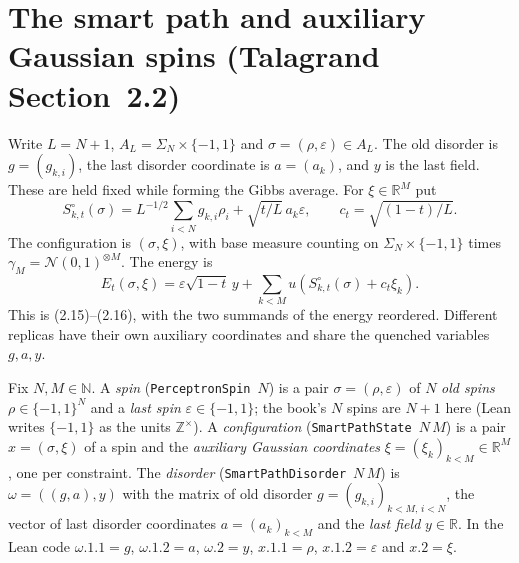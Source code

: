 \section{The smart path and auxiliary Gaussian spins (Talagrand Section~2.2)}\label{sec:sg-tal:perceptron-smart-path}

Write $L=N+1$, $A_L=\Sigma_N\times\{-1,1\}$ and $\sigma=(\rho,\varepsilon)\in A_L$.
The old disorder is $g=(g_{k,i})$, the last disorder coordinate is $a=(a_k)$, and $y$ is the last field.
These are held fixed while forming the Gibbs average. For $\xi\in\mathbb R^M$ put
\[
 S^\circ_{k,t}(\sigma)=L^{-1/2}\sum_{i<N}g_{k,i}\rho_i+\sqrt{t/L}\,a_k\varepsilon,
 \qquad c_t=\sqrt{(1-t)/L}.
\]
The configuration is $(\sigma,\xi)$, with base measure counting on $\Sigma_N\times\{-1,1\}$ times
$\gamma_M=\mathcal N(0,1)^{\otimes M}$. The energy is
\[
 E_t(\sigma,\xi)=\varepsilon\sqrt{1-t}\,y+
     \sum_{k<M}u(S^\circ_{k,t}(\sigma)+c_t\xi_k).
\]
This is (2.15)--(2.16), with the two summands of the energy reordered.
Different replicas have their own auxiliary coordinates and share the quenched variables $g,a,y$.

\begin{definition}\label{def:sg-tal:perceptron-smartpath-types}
  \leanok
{}
Fix $N,M\in\mathbb N$. A \emph{spin} (\texttt{PerceptronSpin}~$N$) is a pair $\sigma=(\rho,\varepsilon)$ of $N$ \emph{old spins}
$\rho\in\{-1,1\}^N$ and a \emph{last spin} $\varepsilon\in\{-1,1\}$; the book's $N$ spins are $N+1$ here (Lean writes
$\{-1,1\}$ as the units $\mathbb Z^\times$). A \emph{configuration} (\texttt{SmartPathState}~$N\,M$) is a pair
$x=(\sigma,\xi)$ of a spin and the \emph{auxiliary Gaussian coordinates} $\xi=(\xi_k)_{k<M}\in\mathbb R^M$, one per constraint.
The \emph{disorder} (\texttt{SmartPathDisorder}~$N\,M$) is $\omega=((g,a),y)$ with the matrix of old disorder
$g=(g_{k,i})_{k<M,\,i<N}$, the vector of last disorder coordinates $a=(a_k)_{k<M}$ and the \emph{last field} $y\in\mathbb R$. In the
Lean code $\omega.1.1=g$, $\omega.1.2=a$, $\omega.2=y$, $x.1.1=\rho$, $x.1.2=\varepsilon$ and $x.2=\xi$.
\end{definition}

